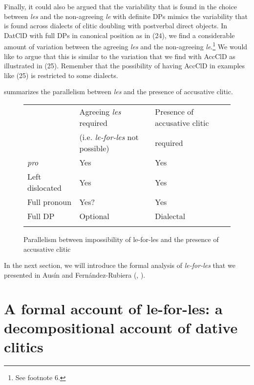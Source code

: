 \documentclass[output=paper,colorlinks,citecolor=brown,
]{langscibook}
\begin{document}


Finally, it could also be argued that the variability that is found in the choice between \textit{les} and the non-agreeing \textit{le} with definite DPs mimics the variability that is found across dialects of clitic doubling with postverbal direct objects. In DatClD with full DPs in canonical position as in (24), we find a considerable amount of variation between the agreeing \textit{les }and the non-agreeing \textit{le}.\footnote{\textrm{ See footnote 6.}}\textit{ }We would like to argue that this is similar to the variation that we find with AccClD as illustrated in (25). Remember that the possibility of having AccClD in examples like (25) is restricted to some dialects.




 summarizes the parallelism between \textit{les} and the presence of accusative clitic.


\begin{figure}
\begin{tabular}{lll}
\lsptoprule
                        & Agreeing \textit{les} required   & Presence of accusative clitic \\
                        & (i.e.  \textit{le-for-les} not possible) & required               \\\midrule
\textit{pro}           & Yes                            & Yes                       \\\midrule
Left dislocated     & Yes                           & Yes                       \\\midrule
Full pronoun        & Yes?                            & Yes                       \\\midrule
Full DP             & Optional & Dialectal                       \\
\lspbottomrule
\end{tabular}
\caption{Parallelism between impossibility of le-for-les and the presence of accusative clitic}
\label{tab:ausin:2}
\end{figure}


In the next section, we will introduce the formal analysis of \textit{le-for-les} that we presented in Ausín and Fernández-Rubiera (\citeyear{ausin2017}, \citeyear{ausin2021}).


\section[A formal account of le{}-for{}-les: a decompositional account of dative clitics]{A formal account of \textup{le-for-les}: a decompositional account of dative clitics}
\end{document}

